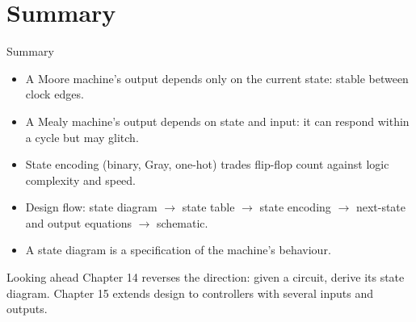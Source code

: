 \documentclass[9pt,aspectratio=169,xcolor=table]{beamer}
\begin{document}
\section{Summary}

\begin{frame}{Summary}
  \begin{itemize}\itemsep3pt\small
    \item A \alert{Moore} machine's output depends only on the current state: stable between clock edges.
    \item A \alert{Mealy} machine's output depends on state and input: it can respond within a cycle but may glitch.
    \item \alert{State encoding} (binary, Gray, one-hot) trades flip-flop count against logic complexity and speed.
    \item Design flow: state diagram $\to$ state table $\to$ state encoding $\to$ next-state and output equations $\to$ schematic.
    \item A state diagram is a specification of the machine's behaviour.
  \end{itemize}
  \begin{block}{Looking ahead}
    Chapter 14 reverses the direction: given a circuit, derive its state diagram. Chapter 15 extends design to controllers with several inputs and outputs.
  \end{block}
\end{frame}
\end{document}
